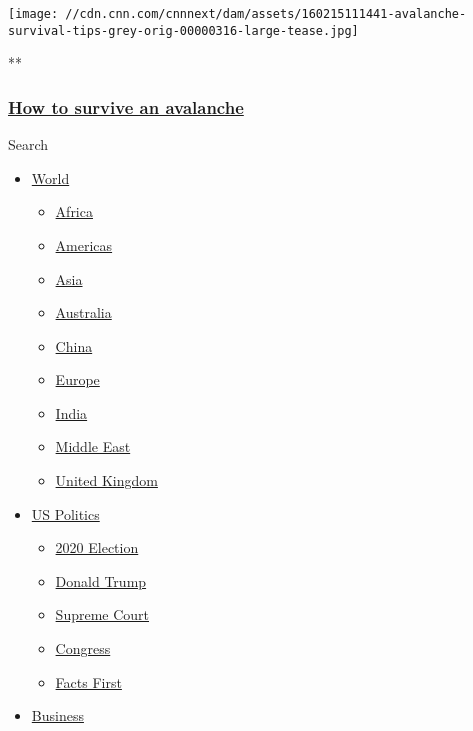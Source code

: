 \href{/videos/weather/2016/02/15/avalanche-survival-tips-grey-orig.cnn}{}

\texttt{[image: //cdn.cnn.com/cnnnext/dam/assets/160215111441-avalanche-survival-tips-grey-orig-00000316-large-tease.jpg]}

**

\hypertarget{how-to-survive-an-avalanche}{%
\subsubsection{\texorpdfstring{\href{/videos/weather/2016/02/15/avalanche-survival-tips-grey-orig.cnn}{How
to survive an
avalanche}}{How to survive an avalanche}}\label{how-to-survive-an-avalanche}}

Search

\begin{itemize}
\tightlist
\item
  \href{/world}{World}

  \begin{itemize}
  \tightlist
  \item
    \href{/africa}{Africa}
  \item
    \href{/americas}{Americas}
  \item
    \href{/asia}{Asia}
  \item
    \href{/australia}{Australia}
  \item
    \href{/china}{China}
  \item
    \href{/europe}{Europe}
  \item
    \href{/india}{India}
  \item
    \href{/middle-east}{Middle East}
  \item
    \href{/uk}{United Kingdom}
  \end{itemize}
\item
  \href{/politics}{US Politics}

  \begin{itemize}
  \tightlist
  \item
    \href{/election/2020}{2020 Election}
  \item
    \href{/specials/politics/president-donald-trump-45}{Donald Trump}
  \item
    \href{/specials/politics/supreme-court-nine}{Supreme Court}
  \item
    \href{/specials/politics/congress}{Congress}
  \item
    \href{/specials/politics/fact-check-politics}{Facts First}
  \end{itemize}
\item
  \href{/business}{Business}


\end{itemize}

